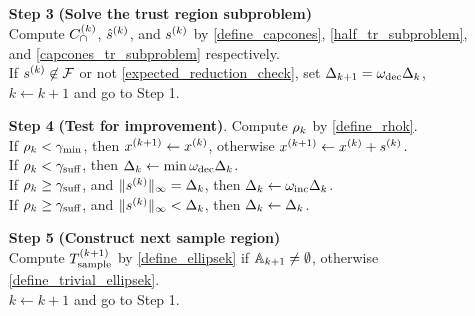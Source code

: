 {\begin{fullwidth}[leftmargin=0in, rightmargin=0in, width=\linewidth-0.25in]
\begin{flushleft}
\begin{algorithm}[H]
\begin{itemize}
		
        \item[\textbf{Step 3}] \textbf{(Solve the trust region subproblem)} \\
        	Compute ${C^{(k)}_{\cap}}$, ${{\hat s}^{(k)}}$, and ${{s}^{(k)}}$ by
        	\cref{define_capcones}, \cref{half_tr_subproblem}, and \cref{capcones_tr_subproblem} respectively. \\
        	If ${{s}^{(k)}} \not \in {\mathcal F}$ or not \cref{expected_reduction_check}, set $\Delta_{k+1} = \omega_{\text{dec}}\Delta_k$, $k \gets k+1$ and go to Step 1.
		
        \item[\textbf{Step 4}] \textbf{(Test for improvement)}.
        	Compute $\rho_k$ by \cref{define_rhok}. \\
			If $\rho_k < \gamma_{\textrm{min}}$, then ${{x}^{(k+1)}} \gets x^{(k)}$, otherwise ${{x}^{(k+1)}} \gets x^{(k)} + {{s}^{(k)}}$. \\
            If $\rho_k < \gamma_{\textrm{suff}}$, then $\Delta_k \gets \min\omega_{\text{dec}}\Delta_k$. \\
            If $\rho_k \ge \gamma_{\textrm{suff}}$, and $\|{{s}^{(k)}}\|_{\infty} = \Delta_k$, then $\Delta_k \gets \omega_{\text{inc}}\Delta_k$. \\
            If $\rho_k \ge \gamma_{\textrm{suff}}$, and $\|{{s}^{(k)}}\|_{\infty} < \Delta_k$, then $\Delta_k \gets \Delta_k$.
            
		
        \item[\textbf{Step 5}] \textbf{(Construct next sample region)} \\
        	Compute ${T_{\text{sample}}^{(k+1)}}$ by \cref{define_ellipsek} if ${\mathbb A_{k+1}} \ne \emptyset$, otherwise \cref{define_trivial_ellipsek}. \\
            $k \gets k+1$ and go to Step 1.
            
% 		
% 		
    \end{itemize}
\end{algorithm}

\end{flushleft}
\end{fullwidth}
}

